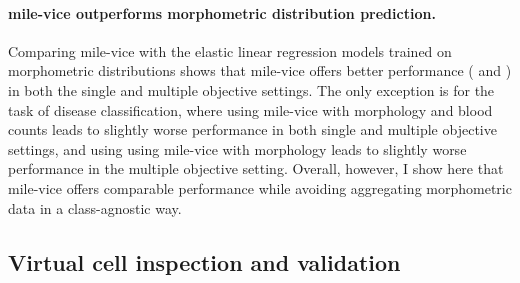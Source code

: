\begin{figure}[!ht]
    \label{fig:mile-vice-roc-curves}
\end{figure}

\paragraph{\Ac{mile-vice} outperforms morphometric distribution prediction.} Comparing \ac{mile-vice} with the elastic linear regression models trained on morphometric distributions shows that \ac{mile-vice} offers better performance ( and ) in both the single and multiple objective settings. The only exception is for the task of disease classification, where using \ac{mile-vice} with morphology and blood counts leads to slightly worse performance in both single and multiple objective settings, and using using \ac{mile-vice} with morphology leads to slightly worse performance in the multiple objective setting. Overall, however, I show here that \ac{mile-vice} offers comparable performance while avoiding aggregating morphometric data in a class-agnostic way. 

\begin{figure}[!ht]
    \label{fig:mile-vice-vs-glmnet}
\end{figure}

\begin{figure}[!ht]
    \label{fig:mile-vice-vs-glmnet-scatter}
\end{figure}

\subsection{Virtual cell inspection and validation}

